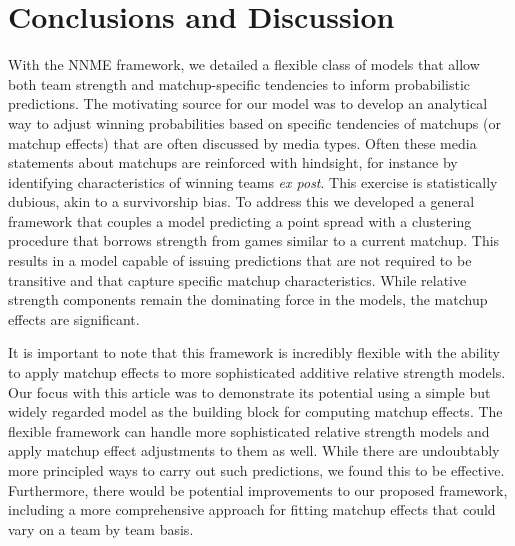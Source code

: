 \documentclass[letterpaper,12pt]{article}
\begin{document}
\section{Conclusions and Discussion}
With the NNME framework, we detailed a flexible class of models that allow both team strength and matchup-specific tendencies to inform probabilistic predictions. The motivating source for our model was to develop an analytical way to adjust winning probabilities based on specific tendencies of matchups (or matchup effects) that are often discussed by media types. Often these media statements about matchups are reinforced with hindsight, for instance by identifying characteristics of winning teams \emph{ex post}. This exercise is statistically dubious, akin to a survivorship bias. To address this we developed a general framework that couples a model predicting a point spread with a clustering procedure that borrows strength from games similar to a current matchup. This results in a model capable of issuing predictions that are not required to be transitive and that capture specific matchup characteristics. While relative strength components remain the dominating force in the models, the matchup effects are significant. 

It is important to note that this framework is incredibly flexible with the ability to apply matchup effects to more sophisticated additive relative strength models. Our focus with this article was to demonstrate its potential using a simple but widely regarded model as the building block for computing matchup effects. The flexible framework can handle more sophisticated relative strength models and apply matchup effect adjustments to them as well. While there are undoubtably more principled ways to carry out such predictions, we found this to be effective. Furthermore, there would be potential improvements to our proposed framework, including a more comprehensive approach for fitting matchup effects that could vary on a team by team basis.


\end{document}
